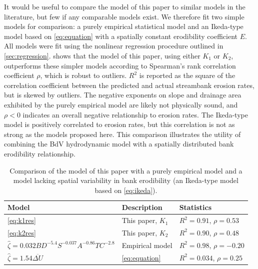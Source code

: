 \documentclass[preprint, review, authoryear, 12pt]{elsarticle}
\begin{document}
It would be useful to compare the model of this paper to similar models in the literature, but few if any comparable models exist. We therefore fit two simple models for comparison: a purely empirical statistical model and an Ikeda-type model based on \cref{eq:equation} with a spatially constant erodibility coefficient $E$. All models were fit using the nonlinear regression procedure outlined in \cref{sec:regression}.  shows that the model of this paper, using either $K_1$ or $K_2$, outperforms these simpler models according to Spearman's rank correlation coefficient $\rho$, which is robust to outliers. $R^2$ is reported as the square of the correlation coefficient between the predicted and actual streambank erosion rates, but is skewed by outliers. The negative exponents on slope and drainage area exhibited by the purely empirical model are likely not physically sound, and $\rho<0$ indicates an overall negative relationship to erosion rates. The Ikeda-type model is positively correlated to erosion rates, but this correlation is not as strong as the models proposed here. This comparison illustrates the utility of combining the BdV hydrodynamic model with a spatially distributed bank erodibility relationship. 

\begin{table}
\centering
\begin{tabular}{lll}
\toprule
Model & Description & Statistics\\
\midrule
\cref{eq:k1res} & This paper, $K_1$ & $R^2=0.91$, $\rho=0.53$\\
\cref{eq:k2res} & This paper, $K_2$ & $R^2=0.90$, $\rho=0.48$\\
$\hat{\zeta} = 0.032\mathit{BD}^{-5.4}S^{-0.037}A^{-0.86}\mathit{TC}^{-2.8}$ & Empirical model & $R^2=0.98$, $\rho=-0.20$\\
$\hat{\zeta} = 1.54 \overline{\Delta U}$ & \cref{eq:equation} & $R^2=0.034$, $\rho=0.25$\\
\bottomrule
\end{tabular}
\caption{Comparison of the model of this paper with a purely empirical model and a model lacking spatial variability in bank erodibility (an Ikeda-type model based on \cref{eq:ikeda}).}\label{tab:compare}
\end{table}
\end{document}

